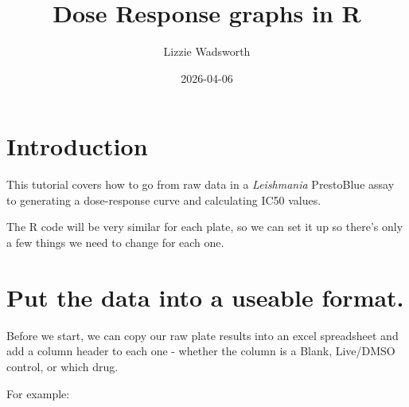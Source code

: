 \documentclass[
  letterpaper,
  DIV=11,
  numbers=noendperiod]{scrreprt}
\title{Dose Response graphs in R}
\author{Lizzie Wadsworth}
\date{2026-04-06}
\renewcommand*\contentsname{Table of contents}
\newcommand\contentsname{Table of contents}
\begin{document}
\maketitle

\renewcommand*\contentsname{Table of contents}
{
\hypersetup{linkcolor=}
\setcounter{tocdepth}{2}
\tableofcontents
}


\chapter*{Introduction}\label{introduction}


This tutorial covers how to go from raw data in a \emph{Leishmania}
PrestoBlue assay to generating a dose-response curve and calculating
IC50 values.

The R code will be very similar for each plate, so we can set it up so
there's only a few things we need to change for each one.


\chapter{Put the data into a useable
format.}\label{put-the-data-into-a-useable-format.}

Before we start, we can copy our raw plate results into an excel
spreadsheet and add a column header to each one - whether the column is
a Blank, Live/DMSO control, or which drug.

For example:
\end{document}
